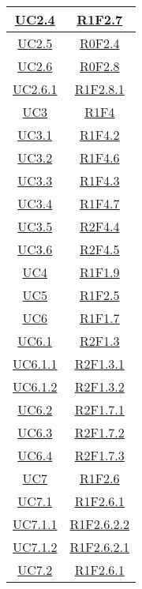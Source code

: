 \begin{longtable}{|c|c|}
\hline
\hyperlink{UC2.4}{UC2.4} & \hyperlink{R1F2.7}{R1F2.7}\\
\hline
\hyperlink{UC2.5}{UC2.5} & \hyperlink{R0F2.4}{R0F2.4}\\
\hline
\hyperlink{UC2.6}{UC2.6} & \hyperlink{R0F2.8}{R0F2.8}\\
\hline
\hyperlink{UC2.6.1}{UC2.6.1} & \hyperlink{R1F2.8.1}{R1F2.8.1}\\
\hline
\hyperlink{UC3}{UC3} & \hyperlink{R1F4}{R1F4}\\
\hline
\hyperlink{UC3.1}{UC3.1} & \hyperlink{R1F4.2}{R1F4.2}\\
\hline
\hyperlink{UC3.2}{UC3.2} & \hyperlink{R1F4.6}{R1F4.6}\\
\hline
\hyperlink{UC3.3}{UC3.3} & \hyperlink{R1F4.3}{R1F4.3}\\
\hline
\hyperlink{UC3.4}{UC3.4} & \hyperlink{R1F4.7}{R1F4.7}\\
\hline
\hyperlink{UC3.5}{UC3.5} & \hyperlink{R2F4.4}{R2F4.4}\\
\hline
\hyperlink{UC3.6}{UC3.6} & \hyperlink{R2F4.5}{R2F4.5}\\
\hline
\hyperlink{UC4}{UC4} & \hyperlink{R1F1.9}{R1F1.9}\\
\hline
\hyperlink{UC5}{UC5} & \hyperlink{R1F2.5}{R1F2.5}\\
\hline
\hyperlink{UC6}{UC6} & \hyperlink{R1F1.7}{R1F1.7}\\
\hline
\hyperlink{UC6.1}{UC6.1} & \hyperlink{R2F1.3}{R2F1.3}\\
\hline
\hyperlink{UC6.1.1}{UC6.1.1} & \hyperlink{R2F1.3.1}{R2F1.3.1}\\
\hline
\hyperlink{UC6.1.2}{UC6.1.2} & \hyperlink{R2F1.3.2}{R2F1.3.2}\\
\hline
\hyperlink{UC6.2}{UC6.2} & \hyperlink{R2F1.7.1}{R2F1.7.1}\\
\hline
\hyperlink{UC6.3}{UC6.3} & \hyperlink{R2F1.7.2}{R2F1.7.2}\\
\hline
\hyperlink{UC6.4}{UC6.4} & \hyperlink{R2F1.7.3}{R2F1.7.3}\\
\hline
\hyperlink{UC7}{UC7} & \hyperlink{R1F2.6}{R1F2.6}\\
\hline
\hyperlink{UC7.1}{UC7.1} & \hyperlink{R1F2.6.1}{R1F2.6.1}\\
\hline
\hyperlink{UC7.1.1}{UC7.1.1} & \hyperlink{R1F2.6.2.2}{R1F2.6.2.2}\\
\hline
\hyperlink{UC7.1.2}{UC7.1.2} & \hyperlink{R1F2.6.2.1}{R1F2.6.2.1}\\
\hline
\hyperlink{UC7.2}{UC7.2} & \hyperlink{R1F2.6.1}{R1F2.6.1}\\

\end{longtable}
